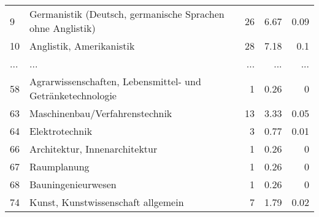 \begin{longtable}{lXrrr}
        9 & \multicolumn{1}{X}{Germanistik (Deutsch, germanische Sprachen ohne Anglistik)} & %
          \num{26} &
          \num[round-mode=places,round-precision=2]{6,67} &
          \num[round-mode=places,round-precision=2]{0,09} \\
        10 & \multicolumn{1}{X}{Anglistik, Amerikanistik} & %
          \num{28} &
          \num[round-mode=places,round-precision=2]{7,18} &
          \num[round-mode=places,round-precision=2]{0,1} \\
       ... & ... & ... & ... & ... \\
        58 & \multicolumn{1}{X}{Agrarwissenschaften, Lebensmittel- und Getränketechnologie} & %
          \num{1} &
          \num[round-mode=places,round-precision=2]{0,26} &
          \num[round-mode=places,round-precision=2]{0} \\

        63 & \multicolumn{1}{X}{Maschinenbau/Verfahrenstechnik} & %
          \num{13} &
          \num[round-mode=places,round-precision=2]{3,33} &
          \num[round-mode=places,round-precision=2]{0,05} \\

        64 & \multicolumn{1}{X}{Elektrotechnik} & %
          \num{3} &
          \num[round-mode=places,round-precision=2]{0,77} &
          \num[round-mode=places,round-precision=2]{0,01} \\

        66 & \multicolumn{1}{X}{Architektur, Innenarchitektur} & %
          \num{1} &
          \num[round-mode=places,round-precision=2]{0,26} &
          \num[round-mode=places,round-precision=2]{0} \\

        67 & \multicolumn{1}{X}{Raumplanung} & %
          \num{1} &
          \num[round-mode=places,round-precision=2]{0,26} &
          \num[round-mode=places,round-precision=2]{0} \\

        68 & \multicolumn{1}{X}{Bauningenieurwesen} & %
          \num{1} &
          \num[round-mode=places,round-precision=2]{0,26} &
          \num[round-mode=places,round-precision=2]{0} \\

        74 & \multicolumn{1}{X}{Kunst, Kunstwissenschaft allgemein} & %
          \num{7} &
          \num[round-mode=places,round-precision=2]{1,79} &
          \num[round-mode=places,round-precision=2]{0,02} \\


\end{longtable}
